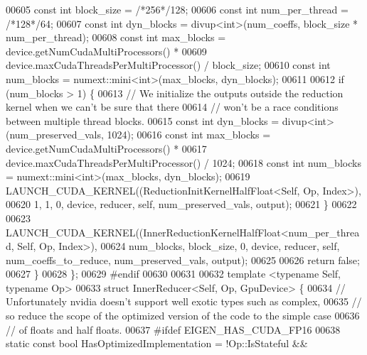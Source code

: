 \begin{DoxyCode}
00605     \textcolor{keyword}{const} \textcolor{keywordtype}{int} block\_size = \textcolor{comment}{/*256*/}128;
00606     \textcolor{keyword}{const} \textcolor{keywordtype}{int} num\_per\_thread = \textcolor{comment}{/*128*/}64;
00607     \textcolor{keyword}{const} \textcolor{keywordtype}{int} dyn\_blocks = divup<int>(num\_coeffs, block\_size * num\_per\_thread);
00608     \textcolor{keyword}{const} \textcolor{keywordtype}{int} max\_blocks = device.getNumCudaMultiProcessors() *
00609                            device.maxCudaThreadsPerMultiProcessor() / block\_size;
00610     \textcolor{keyword}{const} \textcolor{keywordtype}{int} num\_blocks = numext::mini<int>(max\_blocks, dyn\_blocks);
00611 
00612     \textcolor{keywordflow}{if} (num\_blocks > 1) \{
00613       \textcolor{comment}{// We initialize the outputs outside the reduction kernel when we can't be sure that there}
00614       \textcolor{comment}{// won't be a race conditions between multiple thread blocks.}
00615       \textcolor{keyword}{const} \textcolor{keywordtype}{int} dyn\_blocks = divup<int>(num\_preserved\_vals, 1024);
00616       \textcolor{keyword}{const} \textcolor{keywordtype}{int} max\_blocks = device.getNumCudaMultiProcessors() *
00617                            device.maxCudaThreadsPerMultiProcessor() / 1024;
00618       \textcolor{keyword}{const} \textcolor{keywordtype}{int} num\_blocks = numext::mini<int>(max\_blocks, dyn\_blocks);
00619       LAUNCH\_CUDA\_KERNEL((ReductionInitKernelHalfFloat<Self, Op, Index>),
00620                          1, 1, 0, device, reducer, \textcolor{keyword}{self}, num\_preserved\_vals, output);
00621     \}
00622 
00623     LAUNCH\_CUDA\_KERNEL((InnerReductionKernelHalfFloat<num\_per\_thread, Self, Op, Index>),
00624                        num\_blocks, block\_size, 0, device, reducer, \textcolor{keyword}{self}, num\_coeffs\_to\_reduce, 
      num\_preserved\_vals, output);
00625 
00626     \textcolor{keywordflow}{return} \textcolor{keyword}{false};
00627   \}
00628 \};
00629 \textcolor{preprocessor}{#endif}
00630 
00631 
00632 \textcolor{keyword}{template} <\textcolor{keyword}{typename} Self, \textcolor{keyword}{typename} Op>
00633 \textcolor{keyword}{struct }InnerReducer<Self, Op, GpuDevice> \{
00634   \textcolor{comment}{// Unfortunately nvidia doesn't support well exotic types such as complex,}
00635   \textcolor{comment}{// so reduce the scope of the optimized version of the code to the simple case}
00636   \textcolor{comment}{// of floats and half floats.}
00637 \textcolor{preprocessor}{#ifdef EIGEN\_HAS\_CUDA\_FP16}
00638   \textcolor{keyword}{static} \textcolor{keyword}{const} \textcolor{keywordtype}{bool} HasOptimizedImplementation = !Op::IsStateful &&

\end{DoxyCode}
